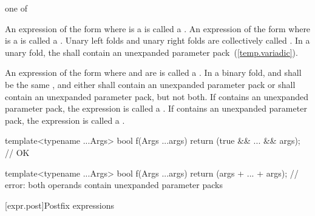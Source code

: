 \begin{bnf}
 \textnormal{one of}\br
    \terminal{+ }\quad\terminal{- }\quad\terminal{* }\quad\terminal{/ }\quad\terminal{\% }\quad\terminal{\^{} }\quad\terminal{\& }\quad\terminal{| }\quad\terminal{\shl\ }\quad\terminal{\shr }\br
    \terminal{+=}\quad\terminal{-=}\quad\terminal{*=}\quad\terminal{/=}\quad\terminal{\%=}\quad\terminal{\^{}=}\quad\terminal{\&=}\quad\terminal{|=}\quad\terminal{\shl=}\quad\terminal{\shr=}\quad\terminal{=}\br
    \terminal{==}\quad\terminal{!=}\quad\terminal{< }\quad\terminal{> }\quad\terminal{<=}\quad\terminal{>=}\quad\terminal{\&\&}\quad\terminal{||}\quad\terminal{,  }\quad{}\quad\terminal{->*}
\end{bnf}

\pnum
{}%
An expression of the form
  
where  is a 
is called a .
An expression of the form
  
where  is a 
is called a .
Unary left folds and unary right folds
are collectively called .
In a unary fold,
the 
shall contain an unexpanded parameter pack~(\ref{temp.variadic}).

\pnum
{}%
An expression of the form
    
where  and  are 
is called a .
In a binary fold,
 and 
shall be the same ,
and either 
shall contain an unexpanded parameter pack
or 
shall contain an unexpanded parameter pack,
but not both.
If  contains an unexpanded parameter pack,
the expression is called a .
If  contains an unexpanded parameter pack,
the expression is called a .
\enterexample
\begin{codeblock}
template<typename ...Args>
bool f(Args ...args) {
  return (true && ... && args); // OK
}

template<typename ...Args>
bool f(Args ...args) {
  return (args + ... + args); // error: both operands contain unexpanded parameter packs
}
\end{codeblock}
\exitexample
{}

[expr.post]{Postfix expressions}%

